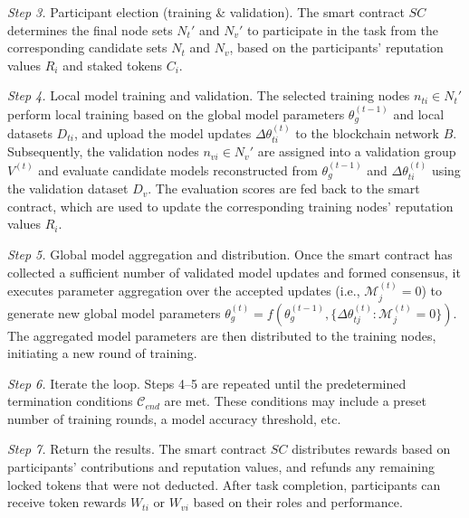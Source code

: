 \documentclass[a4paper]{cas-dc}
\begin{document}
\textit{Step 3.} Participant election (training \& validation). The smart contract $SC$ determines the final node sets $N_t'$ and $N_v'$ to participate in the task from the corresponding candidate sets $N_t$ and $N_v$, based on the participants' reputation values $R_i$ and staked tokens $C_i$.

\textit{Step 4.} Local model training and validation. The selected training nodes $n_{ti} \in N_t'$ perform local training based on the global model parameters $\theta_g^{(t-1)}$ and local datasets $D_{ti}$, and upload the model updates $\Delta\theta_{ti}^{(t)}$ to the blockchain network $B$. Subsequently, the validation nodes $n_{vi} \in N_v'$ are assigned into a validation group $V^{(t)}$ and evaluate candidate models reconstructed from $\theta_g^{(t-1)}$ and $\Delta\theta_{ti}^{(t)}$ using the validation dataset $D_v$. The evaluation scores are fed back to the smart contract, which are used to update the corresponding training nodes' reputation values $R_i$.

\textit{Step 5.} Global model aggregation and distribution. Once the smart contract has collected a sufficient number of validated model updates and formed consensus, it executes parameter aggregation over the accepted updates (i.e., $\mathcal{M}_j^{(t)}=0$) to generate new global model parameters $\theta_g^{(t)} = f(\theta_g^{(t-1)}, \{\Delta\theta_{tj}^{(t)}:\mathcal{M}_j^{(t)}=0\})$. The aggregated model parameters are then distributed to the training nodes, initiating a new round of training.

\textit{Step 6.} Iterate the loop. Steps 4--5 are repeated until the predetermined termination conditions $\mathcal{C}_{end}$ are met. These conditions may include a preset number of training rounds, a model accuracy threshold, etc.

\textit{Step 7.} Return the results. The smart contract $SC$ distributes rewards based on participants' contributions and reputation values, and refunds any remaining locked tokens that were not deducted. After task completion, participants can receive token rewards $W_{ti}$ or $W_{vi}$ based on their roles and performance.
\end{document}
